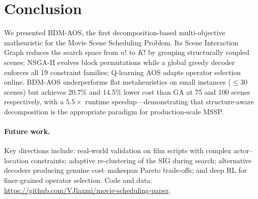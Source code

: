 \section{Conclusion}
\label{sec:conclusion}

We presented BDM-AOS, the first decomposition-based multi-objective matheuristic for the Movie Scene Scheduling Problem.
Its Scene Interaction Graph reduces the search space from $n!$ to $K!$ by grouping structurally coupled scenes; NSGA-II evolves block permutations while a global greedy decoder enforces all 19 constraint families; Q-learning AOS adapts operator selection online.
BDM-AOS underperforms flat metaheuristics on small instances ($\leq 30$ scenes) but achieves 20.7\% and 14.5\% lower cost than GA at 75 and 100 scenes respectively, with a $5.5\times$ runtime speedup---demonstrating that structure-aware decomposition is the appropriate paradigm for production-scale MSSP.

\paragraph{Future work.}
Key directions include: real-world validation on film scripts with complex actor--location constraints; adaptive re-clustering of the SIG during search; alternative decoders producing genuine cost--makespan Pareto trade-offs; and deep RL for finer-grained operator selection.
Code and data: \url{https://github.com/VJlaxmi/movie-scheduling-paper}.
